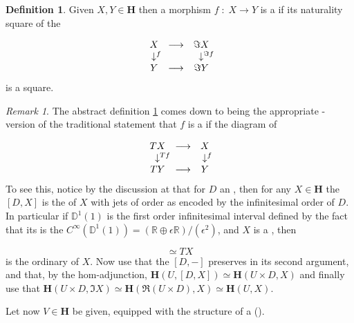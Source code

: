 \documentclass[12pt,titlepage]{article}
\def\mathrlap{\mathpalette\mathrlapinternal}
\def\mathrlapinternal#1#2{\rlap{$\mathsurround=0pt#1{#2}$}}
\newcommand{\itexarray}[1]{\begin{matrix}#1\end{matrix}}
\theoremstyle{plain}
\theoremstyle{definition}
\newtheorem{defn}{Definition}
\theoremstyle{remark}
\newtheorem{remark}{Remark}
\begin{document}
\begin{defn}
\label{LocalDiffeomorphisms}\hypertarget{LocalDiffeomorphisms}{}
Given $X,Y\in \mathbf{H}$ then a morphism $f \;\colon\; X\longrightarrow Y$ is a  if its naturality square of the 

\begin{displaymath}
\itexarray{
    X &\longrightarrow& \Im X
    \\
    \downarrow^{\mathrlap{f}} && \downarrow^{\mathrlap{\Im f}}
    \\
    Y &\longrightarrow& \Im Y
  }
\end{displaymath}
is a  square.

\end{defn}
\begin{remark}
\label{}\hypertarget{}{}
The abstract definition \ref{LocalDiffeomorphisms} comes down to being the appropriate -version of the traditional statement that $f$ is a  if the diagram of 

\begin{displaymath}
\itexarray{
    T X &\longrightarrow& X
    \\
    \downarrow^{\mathrlap{T f}} && \downarrow^{\mathrlap{f}}
    \\
    T Y &\longrightarrow& Y
  }
\end{displaymath}
To see this, notice by the discussion at  that for $D$ an , then for any $X \in \mathbf{H}$ the  $[D,X]$ is the  of $X$ with jets of order as encoded by the infinitesimal order of $D$. In particular if $\mathbb{D}^1(1)$ is the first order infinitesimal interval defined by the fact that its  is the  $C^\infty(\mathbb{D}^1(1)) = (\mathbb{R} \oplus \epsilon \mathbb{R})/(\epsilon^2)$, and $X$ is a , then

\begin{displaymath}
[\mathbb{D}^1(1), X]\simeq T X
\end{displaymath}
is the ordinary  of $X$. Now use that the  $[D,-]$ preserves  in its second argument, and that, by the hom-adjunction, $\mathbf{H}(U, [D,X]) \simeq \mathbf{H}(U \times D, X)$ and finally use that $\mathbf{H}(U \times D, \Im X)\simeq \mathbf{H}(\Re(U \times D), X)\simeq \mathbf{H}(U,X)$.

\end{remark}
Let now $V \in \mathbf{H}$ be given, equipped with the structure of a  ().
\end{document}

